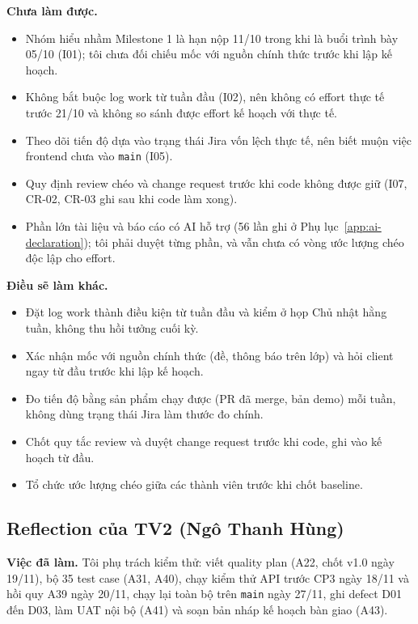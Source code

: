 \textbf{Chưa làm được.}
\begin{itemize}
  \item Nhóm hiểu nhầm Milestone 1 là hạn nộp 11/10 trong khi là buổi trình bày 05/10 (I01); tôi chưa đối chiếu mốc với nguồn chính thức trước khi lập kế hoạch.
  \item Không bắt buộc log work từ tuần đầu (I02), nên không có effort thực tế trước 21/10 và không so sánh được effort kế hoạch với thực tế.
  \item Theo dõi tiến độ dựa vào trạng thái Jira vốn lệch thực tế, nên biết muộn việc frontend chưa vào \texttt{main} (I05).
  \item Quy định review chéo và change request trước khi code không được giữ (I07, CR-02, CR-03 ghi sau khi code làm xong).
  \item Phần lớn tài liệu và báo cáo có AI hỗ trợ (56 lần ghi ở Phụ lục~\ref{app:ai-declaration}); tôi phải duyệt từng phần, và vẫn chưa có vòng ước lượng chéo độc lập cho effort.
\end{itemize}

\textbf{Điều sẽ làm khác.}
\begin{itemize}
  \item Đặt log work thành điều kiện từ tuần đầu và kiểm ở họp Chủ nhật hằng tuần, không thu hồi tưởng cuối kỳ.
  \item Xác nhận mốc với nguồn chính thức (đề, thông báo trên lớp) và hỏi client ngay từ đầu trước khi lập kế hoạch.
  \item Đo tiến độ bằng sản phẩm chạy được (PR đã merge, bản demo) mỗi tuần, không dùng trạng thái Jira làm thước đo chính.
  \item Chốt quy tắc review và duyệt change request trước khi code, ghi vào kế hoạch từ đầu.
  \item Tổ chức ước lượng chéo giữa các thành viên trước khi chốt baseline.
\end{itemize}

\subsection*{Reflection của TV2 (Ngô Thanh Hùng)}

\textbf{Việc đã làm.} Tôi phụ trách kiểm thử: viết quality plan (A22, chốt v1.0 ngày 19/11), bộ 35 test case (A31, A40), chạy kiểm thử API trước CP3 ngày 18/11 và hồi quy A39 ngày 20/11, chạy lại toàn bộ trên \texttt{main} ngày 27/11, ghi defect D01 đến D03, làm UAT nội bộ (A41) và soạn bản nháp kế hoạch bàn giao (A43).

